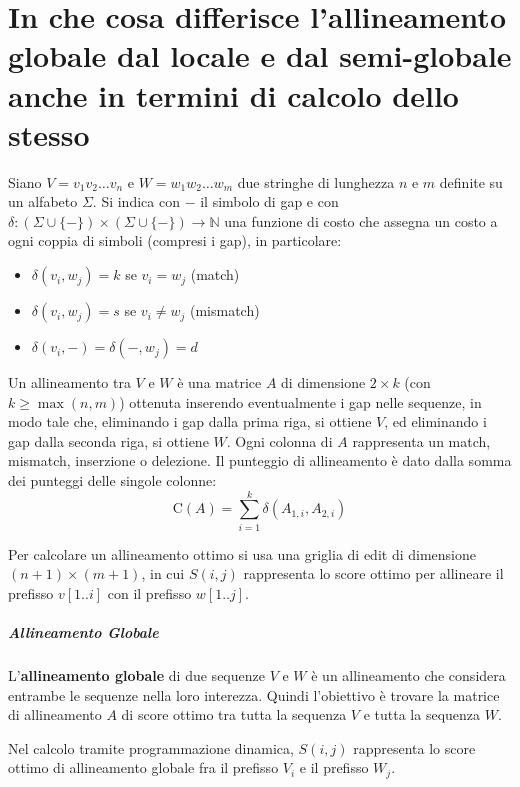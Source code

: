 \chapter{In che cosa differisce l’allineamento globale dal locale e dal semi-globale anche in termini
di calcolo dello stesso}

Siano $V = v_1 v_2 \ldots v_n$ e $W = w_1 w_2 \ldots w_m$ due stringhe di lunghezza $n$ e $m$ definite su un alfabeto $\Sigma$. Si indica con $-$ il simbolo di gap
e con $\delta : (\Sigma \cup \{-\}) \times (\Sigma \cup \{-\}) \rightarrow \mathbb{N}$ una funzione di costo che assegna un costo a ogni coppia di simboli (compresi i gap), in particolare:
\begin{itemize}
    \item $\delta(v_i,w_j)=k$ se $v_i=w_j$ (match)
    \item $\delta(v_i,w_j)=s$ se $v_i \neq w_j$ (mismatch)
    \item $\delta(v_i,-)=\delta(-,w_j)=d$
\end{itemize}

Un allineamento tra $V$ e $W$ è una matrice $A$ di dimensione $2 \times k$ (con $k \geq \max(n,m)$) 
ottenuta inserendo eventualmente i gap nelle sequenze,
in modo tale che, eliminando i gap dalla prima riga, si ottiene $V$,
ed eliminando i gap dalla seconda riga, si ottiene $W$.
Ogni colonna di $A$ rappresenta un match, mismatch, inserzione o delezione.
Il punteggio di allineamento è dato dalla somma dei punteggi delle singole colonne:
\begin{equation}
    \text{C}(A) = \sum_{i=1}^{k} \delta(A_{1,i}, A_{2,i})
\end{equation}

Per calcolare un allineamento ottimo si usa una griglia di edit di dimensione
$(n+1) \times (m+1)$, in cui $S(i,j)$ rappresenta lo score ottimo per allineare il prefisso $v[1..i]$ con il prefisso $w[1..j]$.

\paragraph{Allineamento Globale}

L'\textbf{allineamento globale} di due sequenze $V$ e $W$ è un allineamento che considera entrambe le sequenze nella loro interezza.
Quindi l'obiettivo è trovare la matrice di allineamento $A$ di score ottimo
tra tutta la sequenza $V$ e tutta la sequenza $W$.

Nel calcolo tramite programmazione dinamica, $S(i,j)$ rappresenta lo score
ottimo di allineamento globale fra il prefisso $V_i$ e il prefisso $W_j$.

